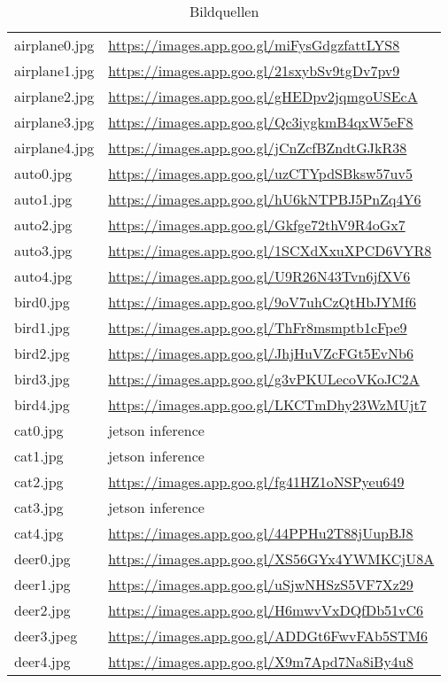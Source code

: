 \begin{longtable}{p{2cm}|p{10cm}|}
\caption{Bildquellen}
\label{TabSource}\\
airplane0.jpg & \url{https://images.app.goo.gl/miFysGdgzfattLYS8}\\
airplane1.jpg & \url{https://images.app.goo.gl/21sxybSv9tgDv7pv9}\\
airplane2.jpg& \url{https://images.app.goo.gl/gHEDpv2jqmgoUSEcA}\\
airplane3.jpg& \url{https://images.app.goo.gl/Qc3iygkmB4qxW5eF8}\\
airplane4.jpg& \url{https://images.app.goo.gl/jCnZcfBZndtGJkR38}\\
auto0.jpg& \url{https://images.app.goo.gl/uzCTYpdSBksw57uv5}\\
auto1.jpg& \url{https://images.app.goo.gl/hU6kNTPBJ5PnZq4Y6}\\
auto2.jpg& \url{https://images.app.goo.gl/Gkfge72thV9R4oGx7}\\
auto3.jpg& \url{https://images.app.goo.gl/1SCXdXxuXPCD6VYR8}\\
auto4.jpg& \url{https://images.app.goo.gl/U9R26N43Tvn6jfXV6}\\
bird0.jpg& \url{https://images.app.goo.gl/9oV7uhCzQtHbJYMf6}\\
bird1.jpg& \url{https://images.app.goo.gl/ThFr8msmptb1cFpe9}\\
bird2.jpg& \url{https://images.app.goo.gl/JhjHuVZcFGt5EvNb6}\\
bird3.jpg& \url{https://images.app.goo.gl/g3vPKULecoVKoJC2A}\\
bird4.jpg& \url{https://images.app.goo.gl/LKCTmDhy23WzMUjt7}\\
cat0.jpg& jetson inference\\
cat1.jpg & jetson inference\\
cat2.jpg& \url{https://images.app.goo.gl/fg41HZ1oNSPyeu649}\\
cat3.jpg& jetson inference\\
cat4.jpg& \url{https://images.app.goo.gl/44PPHu2T88jUupBJ8}\\
deer0.jpg& \url{https://images.app.goo.gl/XS56GYx4YWMKCjU8A}\\
deer1.jpg& \url{https://images.app.goo.gl/uSjwNHSzS5VF7Xz29}\\
deer2.jpg& \url{https://images.app.goo.gl/H6mwvVxDQfDb51vC6}\\
deer3.jpeg& \url{https://images.app.goo.gl/ADDGt6FwvFAb5STM6}\\
deer4.jpg& \url{https://images.app.goo.gl/X9m7Apd7Na8iBy4u8}\\

\end{longtable}
